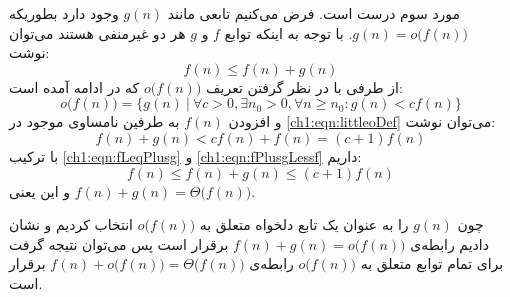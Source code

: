 مورد سوم درست است. فرض می‌کنیم تابعی مانند {$g(n)$} وجود دارد بطوریکه {$g(n)=o\bigl( f(n) \bigr)$}. با توجه به اینکه توابع {$f$} و {$g$} هر دو غیرمنفی هستند می‌توان نوشت:
\begin{equation}
f(n) \leq f(n)+g(n)  \label{ch1:eqn:fLeqPlusg}
\end{equation}
 از طرفی با در نظر گرفتن تعریف {$o\bigl( f(n) \bigr)$} که در ادامه آمده است:
 \begin{equation}
o\bigl( f(n) \bigr) = \lbrace g(n)\ |\ \forall c > 0,\exists n_0>0,\forall n\geq n_0: g(n) < cf(n) \rbrace\label{ch1:eqn:littleoDef}
\end{equation}
و افزودن {$f(n)$} به طرفین نامساوی موجود در {\eqref{ch1:eqn:littleoDef}} می‌توان نوشت:
\begin{equation}
f(n)+g(n) < cf(n) + f(n)=(c+1)f(n) \label{ch1:eqn:fPlusgLessf}
\end{equation}
با ترکیب {\eqref{ch1:eqn:fLeqPlusg}} و {\eqref{ch1:eqn:fPlusgLessf}} داریم:
\begin{displaymath}
f(n) \leq f(n)+g(n) \leq (c+1)f(n)
\end{displaymath}
و این یعنی {$f(n)+g(n)=\Theta \bigl( f(n) \bigr)$}.

چون {$g(n)$} را به عنوان یک تابع دلخواه متعلق به {$o\bigl( f(n) \bigr)$} انتخاب کردیم و نشان دادیم رابطه‌ی
 {$f(n)+g(n)=o \bigl( f(n) \bigr)$} برقرار است پس می‌توان نتیجه گرفت برای تمام توابع متعلق به {$o\bigl( f(n) \bigr)$} رابطه‌ی {$f(n)+o\bigl( f(n) \bigr) = \Theta \bigl( f(n)\bigr)$} برقرار است.


